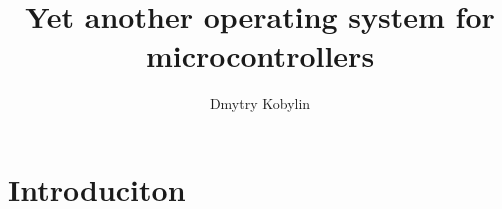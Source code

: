\documentclass[a4paper,russian]{article}
\title{Yet another operating system for microcontrollers}
\author{Dmytry Kobylin}
\begin{document}
\maketitle

\tableofcontents
\newpage

\section{Introduciton}
\end{document}
